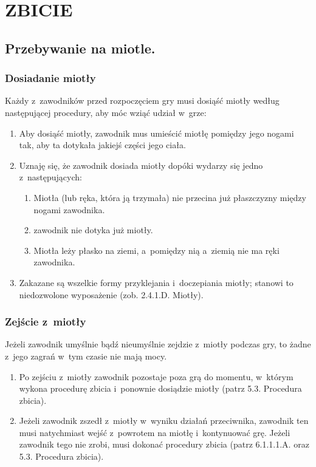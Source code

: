 \documentclass[12pt]{article}
\begin{document}
\pagebreak
\section{ZBICIE}

\subsection{Przebywanie na miotle.}

\subsubsection{Dosiadanie miotły}

Każdy z~zawodników przed rozpoczęciem gry musi dosiąść miotły według
następującej procedury, aby móc wziąć udział w~grze:

\begin{enumerate}
	\item
	      Aby dosiąść miotły, zawodnik mus umieścić miotłę pomiędzy jego nogami
	      tak, aby ta dotykała jakiejś części jego ciała.
	\item
	      Uznaję się, że zawodnik dosiada miotły dopóki wydarzy się jedno z~następujących:

	      \begin{enumerate}
		      \item
		            Miotła (lub ręka, która ją trzymała) nie przecina już płaszczyzny
		            między nogami zawodnika.
		      \item
		            zawodnik nie dotyka już miotły.
		      \item
		            Miotła leży płasko na ziemi, a~pomiędzy nią a~ziemią nie ma ręki
		            zawodnika.
	      \end{enumerate}
	\item
	      Zakazane są wszelkie formy przyklejania i~doczepiania miotły; stanowi
	      to niedozwolone wyposażenie (zob. 2.4.1.D. Miotły).
\end{enumerate}

\subsubsection{Zejście z~miotły}

Jeżeli zawodnik umyślnie bądź nieumyślnie zejdzie z~miotły podczas gry,
to żadne z~jego zagrań w~tym czasie nie mają mocy.

\begin{enumerate}
	\item
	      Po zejściu z~miotły zawodnik pozostaje poza grą do momentu, w~którym
	      wykona procedurę zbicia i~ponownie dosiądzie miotły (patrz 5.3.
	      Procedura zbicia).
	\item
	      Jeżeli zawodnik zszedł z~miotły w~wyniku działań przeciwnika, zawodnik
	      ten musi natychmiast wejść z~powrotem na miotłę i~kontynuować grę.
	      Jeżeli zawodnik tego nie zrobi, musi dokonać procedury zbicia (patrz
	      6.1.1.1.A. oraz 5.3. Procedura zbicia).
\end{enumerate}
\end{document}
